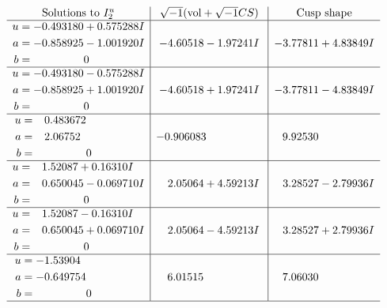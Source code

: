 \documentclass[1p]{elsarticle_modified}
\theoremstyle{definition}
\newcommand{\I}{\sqrt{-1}}
\begin{document}
$$\begin{array}{c|c|c}  
\text{Solutions to }I^u_{2}& \I (\text{vol} + \sqrt{-1}CS) & \text{Cusp shape}\\
 \hline 
\begin{aligned}
u &= -0.493180 + 0.575288 I \\
a &= -0.858925 - 1.001920 I \\
b &= \phantom{-0.000000 } 0\end{aligned}
 & -4.60518 - 1.97241 I & -3.77811 + 4.83849 I \\ \hline\begin{aligned}
u &= -0.493180 - 0.575288 I \\
a &= -0.858925 + 1.001920 I \\
b &= \phantom{-0.000000 } 0\end{aligned}
 & -4.60518 + 1.97241 I & -3.77811 - 4.83849 I \\ \hline\begin{aligned}
u &= \phantom{-}0.483672\phantom{ +0.000000I} \\
a &= \phantom{-}2.06752\phantom{ +0.000000I} \\
b &= \phantom{-0.000000 } 0\end{aligned}
 & -0.906083\phantom{ +0.000000I} & \phantom{-}9.92530\phantom{ +0.000000I} \\ \hline\begin{aligned}
u &= \phantom{-}1.52087 + 0.16310 I \\
a &= \phantom{-}0.650045 - 0.069710 I \\
b &= \phantom{-0.000000 } 0\end{aligned}
 & \phantom{-}2.05064 + 4.59213 I & \phantom{-}3.28527 - 2.79936 I \\ \hline\begin{aligned}
u &= \phantom{-}1.52087 - 0.16310 I \\
a &= \phantom{-}0.650045 + 0.069710 I \\
b &= \phantom{-0.000000 } 0\end{aligned}
 & \phantom{-}2.05064 - 4.59213 I & \phantom{-}3.28527 + 2.79936 I \\ \hline\begin{aligned}
u &= -1.53904\phantom{ +0.000000I} \\
a &= -0.649754\phantom{ +0.000000I} \\
b &= \phantom{-0.000000 } 0\end{aligned}
 & \phantom{-}6.01515\phantom{ +0.000000I} & \phantom{-}7.06030\phantom{ +0.000000I}\\
 \hline 
 \end{array}$$\newpage
\end{document}
